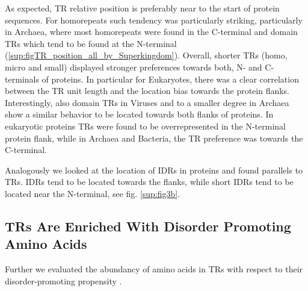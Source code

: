\documentclass[a4,center,fleqn]{NAR}
\begin{document}
As expected, TR relative position is preferably near to the start of protein sequences.  For homorepeats such tendency was particularly striking, particularly in Archaea, where most homorepeats were found in the C-terminal and domain TRs which tend to be found at the N-terminal (\ref{sup:figTR_position_all_by_Superkingdom}).
Overall, shorter TRs (homo, micro and small) displayed stronger preferences towards both, N- and C- terminals of proteins. 
In particular for Eukaryotes, there was a clear correlation between the TR unit length and the location bias towards the protein flanks. 
Interestingly, also domain TRs in Viruses and to a smaller degree in Archaea show a similar behavior to be located towards both flanks of proteins.
In eukaryotic proteins TRs were found to be overrepresented in the N-terminal protein flank, while in Archaea and Bacteria, the TR preference was towards the C-terminal. 


Analogously we looked at the location of IDRs in proteins and found parallels to TRs. IDRs tend to be located towards the flanks, while short IDRs tend to be located near the N-terminal, see fig. \ref{sup:fig3b}. 

\subsection{TRs Are Enriched With Disorder Promoting Amino Acids}
Further we evaluated the abundancy of amino acids in TRs with respect to their disorder-promoting propensity \cite{Uversky2013}.
\end{document}
